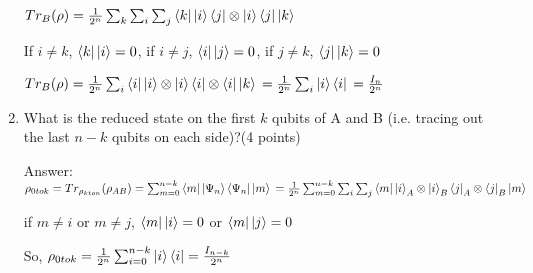 \documentclass{article}
\begin{document}
\begin{enumerate}
          $Tr_B(\rho)=\frac{1}{2^n}\sum_k\sum_i\sum_j\bra{k}\ket{i}\bra{j}\otimes\ket{i}\bra{j}\ket{k}$

          If $i\neq k$, $\bra{k}\ket{i}=0$, if $i\neq j$, $\bra{i}\ket{j}=0$, if $j\neq k$, $\bra{j}\ket{k}=0$


          $Tr_B(\rho)=\frac{1}{2^n}\sum_i\bra{i}\ket{i}\otimes\ket{i}\bra{i}\otimes\bra{i}\ket{k}
              \\=\frac{1}{2^n}\sum_i\ket{i}\bra{i}
              \\=\frac{I_n}{2^n}
          $
    \item What is the reduced state on the first $k$ qubits of A and B (i.e. tracing out the last $n - k$ qubits on each side)?(4 points)

          Answer: $\rho_{0 to k} = Tr_{\rho_{k to n}}(\rho_{AB}) = \sum_{m=0}^{n-k}\bra{m}\ket{\Psi_n}\bra{\Psi_n}\ket{m}
              \\=\frac{1}{2^n}\sum_{m=0}^{n-k}\sum_i\sum_j\bra{m}\ket{i}_A\otimes\ket{i}_B\bra{j}_A\otimes\bra{j}_B\ket{m}
          $

          if $m\neq i$ or $m\neq j$, $\bra{m}\ket{i}=0$ or $\bra{m}\ket{j}=0$

          So, $\rho_{0 to k}=\frac{1}{2^n}\sum_{i=0}^{n-k}\ket{i}\bra{i}=\frac{I_{n-k}}{2^n}$
\end{enumerate}
\end{document}
